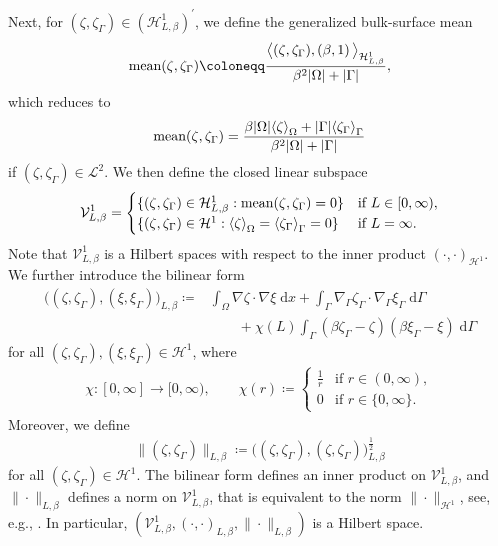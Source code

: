 \documentclass[11pt,reqno]{amsart}
\theoremstyle{remark}
\numberwithin{equation}{section}
\newcommand{\abs}[1]{|#1|}
\newcommand{\norm}[1]{\| #1 \|}
\newcommand{\bigang}[2]{ \big< #1 , #2  \big>}
\newcommand{\scp}[2]{ \left( #1 , #2  \right)}
\newcommand{\bigscp}[2]{\big( #1 , #2 \big)}
\newcommand{\meano}[1]{{\langle #1 \rangle}_{\Omega}}
\newcommand{\meang}[1]{{\langle #1 \rangle}_{\Gamma}}
\newcommand{\mean}[2]{\textnormal{mean}(#1,#2)}
\newcommand{\intO}{\int_\Omega}
\newcommand{\intG}{\int_\Gamma}
\newcommand{\dx}{\;\mathrm{d}x}
\newcommand{\dG}{\;\mathrm d\Ga}
\newcommand{\Grad}{\nabla}
\newcommand{\Gradg}{\nabla_\Ga}
\newcommand{\Om}{\Omega}
\newcommand{\Ga}{\Gamma}
\begin{document}
Next, for $(\zeta,\zeta_\Ga)\in(\mathcal{H}^1_{L,\beta})^\prime$, we define the generalized bulk-surface mean
\begin{align*}
	\mean{\zeta}{\zeta_\Ga} \coloneqq \frac{\bigang{(\zeta,\zeta_\Ga)}{\scp{\beta}{1}}_{\mathcal{H}^1_{L,\beta}}}{\beta^2\abs{\Om} + \abs{\Ga}},
\end{align*}
which reduces to
\begin{align*}
	\mean{\zeta}{\zeta_\Ga} = \frac{\beta\abs{\Om}\meano{\zeta} + \abs{\Ga}\meang{\zeta_\Ga}}{\beta^2\abs{\Om} + \abs{\Ga}}
\end{align*}
if $(\zeta,\zeta_\Ga)\in\mathcal{L}^2$. We then define the closed linear subspace
\begin{align*}
	\mathcal{V}^1_{L,\beta} = \begin{cases}
	\{(\zeta,\zeta_\Ga)\in\mathcal{H}^1_{L,\beta}:  \mean{\zeta}{\zeta_\Ga} = 0\} &\text{if~}L\in[0,\infty), \\
	\{(\zeta,\zeta_\Ga)\in\mathcal{H}^1: \meano{\zeta} = \meang{\zeta_\Ga} = 0\} &\text{if~} L = \infty.
	\end{cases}
\end{align*}
Note that $\mathcal{V}^1_{L,\beta}$ is a Hilbert spaces with respect to the inner product $\scp{\cdot}{\cdot}_{\mathcal{H}^1}$. We further introduce the bilinear form
\begin{align*}
	\bigscp{(\zeta,\zeta_\Ga)}{(\xi,\xi_\Ga)}_{L,\beta} \coloneqq &\intO \Grad\zeta\cdot\Grad\xi\dx + \intG \Gradg\zeta_\Ga\cdot\Gradg\xi_\Ga\dG \\
	&\qquad + \chi(L) \intG (\beta\zeta_\Ga - \zeta)(\beta\xi_\Ga - \xi)\dG
\end{align*}
for all $(\zeta,\zeta_\Ga), (\xi,\xi_\Ga)\in\mathcal{H}^1$, where
\begin{align*}
	\chi:[0,\infty]\rightarrow [0,\infty), \qquad 
    \chi(r) \coloneqq 
    \begin{cases} 
    \frac{1}{r} &\text{if~}r\in(0,\infty), \\
	0 &\text{if~} r\in\{0,\infty\}.
	\end{cases}
\end{align*}
Moreover, we define
\begin{align*}
	\norm{(\zeta,\zeta_\Ga)}_{L,\beta} \coloneqq \big((\zeta,\zeta_\Ga),(\zeta,\zeta_\Ga)\big)_{L,\beta}^{\frac12}
\end{align*}
for all $(\zeta,\zeta_\Ga)\in\mathcal{H}^1$. The bilinear form defines an inner product on $\mathcal{V}^1_{L,\beta}$, and $\norm{\cdot}_{L,\beta}$ defines a norm on $\mathcal{V}^1_{L,\beta}$, that is equivalent to the norm $\norm{\cdot}_{\mathcal{H}^1}$, see, e.g., \cite[Corollary A.2]{Knopf2021}. In particular, $(\mathcal{V}^1_{L,\beta},\scp{\cdot}{\cdot}_{L,\beta},\norm{\cdot}_{L,\beta})$ is a Hilbert space. 
\end{document}
